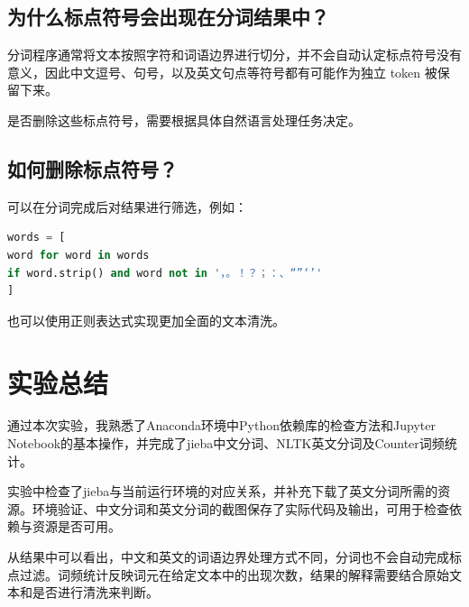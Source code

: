 \documentclass[fontset=none,zihao=-4,a4paper]{ctexart}
\begin{document}
	\subsection{为什么标点符号会出现在分词结果中？}
	
	分词程序通常将文本按照字符和词语边界进行切分，并不会自动认定标点符号没有意义，因此中文逗号、句号，以及英文句点等符号都有可能作为独立 token 被保留下来。
	
	是否删除这些标点符号，需要根据具体自然语言处理任务决定。
	
	\subsection{如何删除标点符号？}
	
	可以在分词完成后对结果进行筛选，例如：
	
	\par\noindent\begin{minipage}[t]{\linewidth}
\begin{lstlisting}[language=Python]
words = [
word for word in words
if word.strip() and word not in '，。！？；：、“”‘’'
]
	\end{lstlisting}
\end{minipage}\par
	
	也可以使用正则表达式实现更加全面的文本清洗。
	
	\section{实验总结}
通过本次实验，我熟悉了Anaconda环境中Python依赖库的检查方法和Jupyter Notebook的基本操作，并完成了jieba中文分词、NLTK英文分词及Counter词频统计。

实验中检查了jieba与当前运行环境的对应关系，并补充下载了英文分词所需的资源。环境验证、中文分词和英文分词的截图保存了实际代码及输出，可用于检查依赖与资源是否可用。

从结果中可以看出，中文和英文的词语边界处理方式不同，分词也不会自动完成标点过滤。词频统计反映词元在给定文本中的出现次数，结果的解释需要结合原始文本和是否进行清洗来判断。
\end{document}

